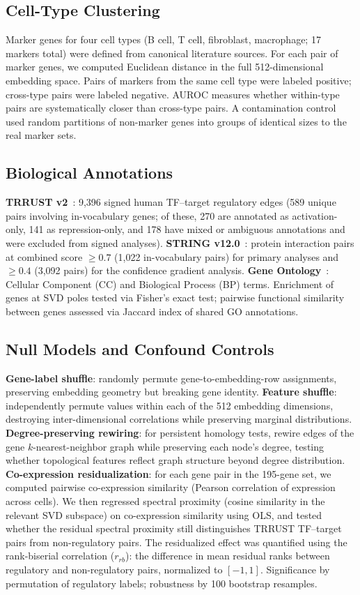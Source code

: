 \documentclass[10pt,twocolumn]{article}
\begin{document}
\subsection{Cell-Type Clustering}
Marker genes for four cell types (B cell, T cell, fibroblast, macrophage; 17 markers total) were defined from canonical literature sources.
For each pair of marker genes, we computed Euclidean distance in the full 512-dimensional embedding space.
Pairs of markers from the same cell type were labeled positive; cross-type pairs were labeled negative.
AUROC measures whether within-type pairs are systematically closer than cross-type pairs.
A contamination control used random partitions of non-marker genes into groups of identical sizes to the real marker sets.

\subsection{Biological Annotations}
\textbf{TRRUST v2}~\citep{han2018trrust}: 9{,}396 signed human TF--target regulatory edges (589 unique pairs involving in-vocabulary genes; of these, 270 are annotated as activation-only, 141 as repression-only, and 178 have mixed or ambiguous annotations and were excluded from signed analyses).
\textbf{STRING v12.0}~\citep{szklarczyk2023string}: protein interaction pairs at combined score $\geq 0.7$ (1{,}022 in-vocabulary pairs) for primary analyses and $\geq 0.4$ (3{,}092 pairs) for the confidence gradient analysis.
\textbf{Gene Ontology}~\citep{ashburner2000gene}: Cellular Component (CC) and Biological Process (BP) terms.
Enrichment of genes at SVD poles tested via Fisher's exact test; pairwise functional similarity between genes assessed via Jaccard index of shared GO annotations.

\subsection{Null Models and Confound Controls}
\textbf{Gene-label shuffle}: randomly permute gene-to-embedding-row assignments, preserving embedding geometry but breaking gene identity.
\textbf{Feature shuffle}: independently permute values within each of the 512 embedding dimensions, destroying inter-dimensional correlations while preserving marginal distributions.
\textbf{Degree-preserving rewiring}: for persistent homology tests, rewire edges of the gene $k$-nearest-neighbor graph while preserving each node's degree, testing whether topological features reflect graph structure beyond degree distribution.
\textbf{Co-expression residualization}: for each gene pair in the 195-gene set, we computed pairwise co-expression similarity (Pearson correlation of expression across cells).
We then regressed spectral proximity (cosine similarity in the relevant SVD subspace) on co-expression similarity using OLS, and tested whether the residual spectral proximity still distinguishes TRRUST TF--target pairs from non-regulatory pairs.
The residualized effect was quantified using the rank-biserial correlation ($r_{rb}$): the difference in mean residual ranks between regulatory and non-regulatory pairs, normalized to $[-1, 1]$.
Significance by permutation of regulatory labels; robustness by 100 bootstrap resamples.
\end{document}
